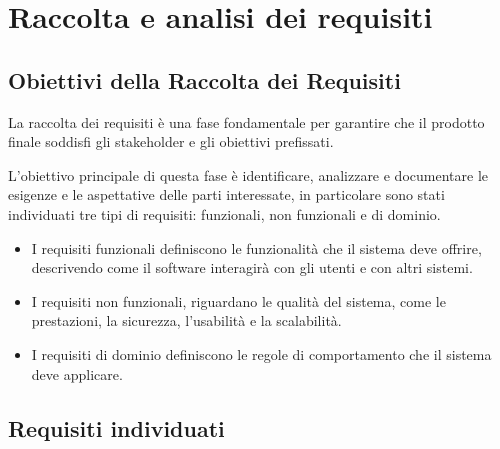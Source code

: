 \chapter{Raccolta e analisi dei requisiti}

\section{Obiettivi della Raccolta dei Requisiti}
La raccolta dei requisiti è una fase fondamentale per garantire che il prodotto finale soddisfi gli stakeholder e gli obiettivi prefissati.

L'obiettivo principale di questa fase è identificare, analizzare e documentare le esigenze e le aspettative delle parti interessate, in particolare sono stati individuati tre tipi di requisiti: funzionali, non funzionali e di dominio.
\begin{itemize}
	\item I requisiti funzionali definiscono le funzionalità che il sistema deve offrire, descrivendo come il software interagirà con gli utenti e con altri sistemi.
	\item I requisiti non funzionali, riguardano le qualità del sistema, come le prestazioni, la sicurezza, l'usabilità e la scalabilità.
	\item I requisiti di dominio definiscono le regole di comportamento che il sistema deve applicare.
\end{itemize}

\newpage
\section{Requisiti individuati}
